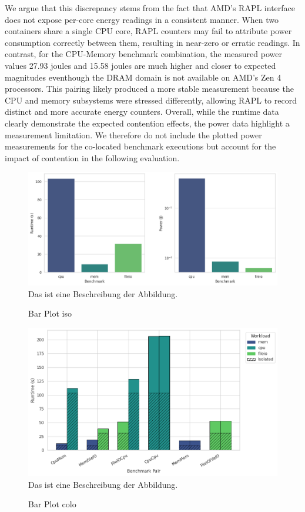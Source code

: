 We argue that this discrepancy stems from the fact that AMD's RAPL interface does not expose per-core energy readings in a consistent manner. When two containers share a single CPU core, RAPL counters may fail to attribute power consumption correctly between them, resulting in near-zero or erratic readings. In contrast, for the CPU-Memory benchmark combination, the measured power values 27.93 joules and 15.58 joules are much higher and closer to expected magnitudes eventhough the DRAM domain is not available on AMD's Zen 4 processors. This pairing likely produced a more stable measurement because the CPU and memory subsystems were stressed differently, allowing RAPL to record distinct and more accurate energy counters.
Overall, while the runtime data clearly demonstrate the expected contention effects, the power data highlight a measurement limitation. We therefore do not include the plotted power measurements for the co-located benchmark executions but account for the impact of contention in the following evaluation.

\begin{figure}[H]
    \caption{Bar Plot iso}
    \includegraphics[scale=0.5]{fig/06/06-barplot-iso-bench.png}
    \label{fig:bar_plot_iso_bench}
    \newline
    \tiny
    Das ist eine Beschreibung der Abbildung.
\end{figure}
\begin{figure}[H]
    \caption{Bar Plot colo}
    \includegraphics[scale=0.5]{fig/06/06-barplot-colo-bench.png}
    \label{fig:bar_plot_colo_bench}
    \newline
    \tiny
    Das ist eine Beschreibung der Abbildung.
\end{figure}

